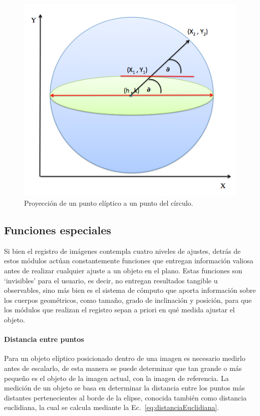 \begin{figure}[hb!]
  \begin{center}
    \includegraphics[scale=.5]{image/proyeccionPunto}
  \end{center}
  \caption{Proyección de un punto elíptico a un punto del círculo.} \label{img:proyeccionPunto}
\end{figure}

\subsection{Funciones especiales}

Si bien el registro de imágenes contempla cuatro niveles de ajustes,
detrás de estos módulos actúan constantemente funciones que entregan
información valiosa antes de realizar cualquier ajuste a un objeto en
el plano. Estas funciones son ‘invisibles’ para el usuario, es decir,
no entregan resultados tangible u observables, sino más bien es el
sistema de cómputo que aporta información sobre los cuerpos
geométricos, como tamaño, grado de inclinación y posición, para que
los módulos que realizan el registro sepan a priori en qué medida
ajustar el objeto.

\paragraph{Distancia entre puntos}

Para un objeto elíptico posicionado dentro de una imagen es necesario
medirlo antes de escalarlo, de esta manera se puede determinar que tan
grande o más pequeño es el objeto de la imagen actual, con la imagen
de referencia. La medición de un objeto se basa en determinar la
distancia entre los puntos más distantes pertenecientes al borde de la
elipse, conocida también como distancia euclidiana, la cual se calcula
mediante la Ec.~\ref{eq:distanciaEuclidiana}.

